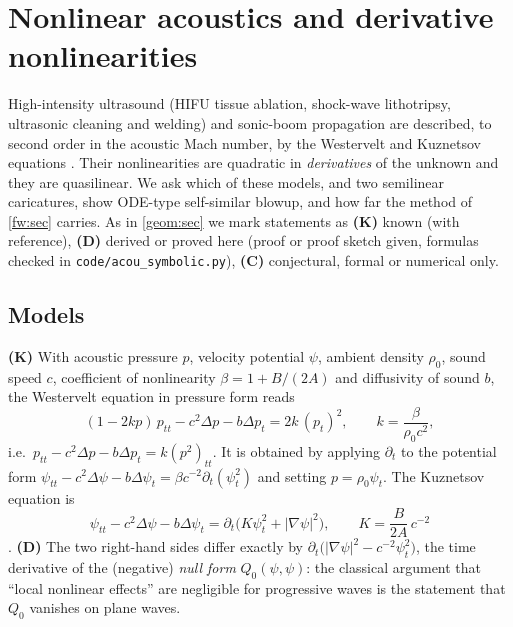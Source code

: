 \section{Nonlinear acoustics and derivative nonlinearities}
\label{acou:sec}

High-intensity ultrasound (HIFU tissue ablation, shock-wave lithotripsy,
ultrasonic cleaning and welding) and sonic-boom propagation are described, to
second order in the acoustic Mach number, by the Westervelt and Kuznetsov
equations \cite{HamiltonBlackstock1998,Kaltenbacher2015}. Their
nonlinearities are quadratic in \emph{derivatives} of the unknown and they are
quasilinear. We ask which of these models, and two semilinear caricatures,
show ODE-type self-similar blowup, and how far the method of \cref{fw:sec}
carries. As in \cref{geom:sec} we mark statements as
\textbf{(K)} known (with reference), \textbf{(D)} derived or proved here
(proof or proof sketch given, formulas checked in
\texttt{code/acou\_symbolic.py}), \textbf{(C)} conjectural, formal or
numerical only.

\subsection{Models}
\label{acou:sub-models}
\textbf{(K)} With acoustic pressure $p$, velocity potential $\psi$, ambient
density $\rho_0$, sound speed $c$, coefficient of nonlinearity
$\beta=1+B/(2A)$ and diffusivity of sound $b$, the Westervelt equation in
pressure form reads
\begin{equation}\label{acou:west}
  (1-2kp)\,p_{tt}-c^2\Delta p-b\Delta p_t=2k\,(p_t)^2,\qquad
  k=\frac{\beta}{\rho_0c^2},
\end{equation}
i.e.\ $p_{tt}-c^2\Delta p-b\Delta p_t=k(p^2)_{tt}$. It is obtained by
applying $\partial_t$ to the potential form
$\psi_{tt}-c^2\Delta\psi-b\Delta\psi_t=\beta c^{-2}\partial_t(\psi_t^2)$ and
setting $p=\rho_0\psi_t$. The Kuznetsov equation is
\begin{equation}\label{acou:kuz}
  \psi_{tt}-c^2\Delta\psi-b\Delta\psi_t
  =\partial_t\big(K\psi_t^2+|\nabla\psi|^2\big),\qquad K=\frac{B}{2A}\,c^{-2}
\end{equation}
\cite{Kuznetsov1971,Westervelt1963,Kaltenbacher2015}.
\textbf{(D)} The two
right-hand sides differ exactly by
$\partial_t\big(|\nabla\psi|^2-c^{-2}\psi_t^2\big)$, the time derivative of
the (negative) \emph{null form} $Q_0(\psi,\psi)$: the classical argument that
``local nonlinear effects'' are negligible for progressive waves is the
statement that $Q_0$ vanishes on plane waves.

